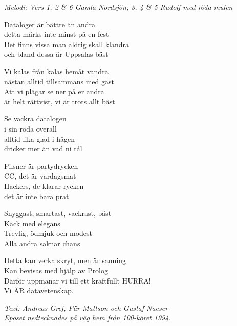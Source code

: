 {\footnotesize\textit{Melodi: Vers 1, 2 \& 6 Gamla Nordsjön; 3, 4 \& 5 Rudolf med röda mulen}}\par
\vspace{10pt}
Dataloger är bättre än andra\\
detta märks inte minst på en fest\\
Det finns vissa man aldrig skall klandra\\
och bland dessa är Uppsalas bäst\par
\vspace{10pt}
Vi kalas från kalas hemåt vandra\\
nästan alltid tillsammans med gäst\\
Att vi plägar se ner på er andra\\
är helt rättvist, vi är trots allt bäst\par
\newpage
Se vackra datalogen\\
i sin röda overall\\
alltid lika glad i hågen\\
dricker mer än vad ni tål\par
\vspace{10pt}
Pilsner är partydrycken\\
CC, det är vardagsmat\\
Hackers, de klarar rycken\\
det är inte bara prat\par
\vspace{10pt}
Snyggast, smartast, vackrast, bäst\\
Käck med elegans\\
Trevlig, ödmjuk och modest\\
Alla andra saknar chans\par
\vspace{10pt}
Detta kan verka skryt, men är sanning\\
Kan bevisas med hjälp av Prolog\\
Därför uppmanar vi till ett kraftfullt HURRA!\\
Vi ÄR datavetenskap.\par
\vspace{10pt}
{\footnotesize\textit{Text: Andreas Gref, Pär Mattson och Gustaf Naeser\\
Eposet nedtecknades på väg hem från 100-köret 1994.}}
